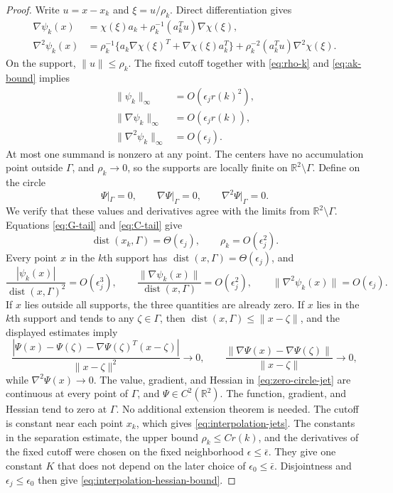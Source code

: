 \documentclass[11pt]{article}
\newcommand{\R}{\mathbb R}
\newcommand{\norm}[1]{\lVert #1\rVert}
\begin{document}
\begin{proof}
Write $u=x-x_k$ and $\xi=u/\rho_k$.  Direct differentiation gives
\begin{align*}
\nabla\psi_k(x)
&=\chi(\xi)a_k
+\rho_k^{-1}(a_k^Tu)\nabla\chi(\xi),\\
\nabla^2\psi_k(x)
&=\rho_k^{-1}\{a_k\nabla\chi(\xi)^T
+\nabla\chi(\xi)a_k^T\}
+\rho_k^{-2}(a_k^Tu)\nabla^2\chi(\xi).
\end{align*}
On the support, $\|u\|\le\rho_k$.  The fixed cutoff together with
\eqref{eq:rho-k} and \eqref{eq:ak-bound} implies
\begin{align*}
\|\psi_k\|_\infty&=O(\epsilon_jr(k)^2),\\
\|\nabla\psi_k\|_\infty&=O(\epsilon_jr(k)),\\
\|\nabla^2\psi_k\|_\infty&=O(\epsilon_j).
\end{align*}
At most one summand is nonzero at any point.  The centers have no accumulation
point outside $\Gamma$, and $\rho_k\to0$, so the supports are locally finite on
$\R^2\setminus\Gamma$.  Define on the circle
\begin{equation}\label{eq:zero-circle-jet}
\Psi|_\Gamma=0,\qquad
\nabla\Psi|_\Gamma=0,\qquad
\nabla^2\Psi|_\Gamma=0.
\end{equation}
We verify that these values and derivatives agree with the limits from
$\R^2\setminus\Gamma$.  Equations
\eqref{eq:G-tail} and \eqref{eq:C-tail} give
\[
\operatorname{dist}(x_k,\Gamma)=\Theta(\epsilon_j),
\qquad \rho_k=O(\epsilon_j^2).
\]
Every point $x$ in the $k$th support has
$\operatorname{dist}(x,\Gamma)=\Theta(\epsilon_j)$, and
\[
\frac{|\psi_k(x)|}{\operatorname{dist}(x,\Gamma)^2}=O(\epsilon_j^3),
\qquad
\frac{\|\nabla\psi_k(x)\|}{\operatorname{dist}(x,\Gamma)}
=O(\epsilon_j^2),
\qquad
\|\nabla^2\psi_k(x)\|=O(\epsilon_j).
\]
If $x$ lies outside all supports, the three quantities are already zero.  If
$x$ lies in the $k$th support and tends to any $\zeta\in\Gamma$, then
$\operatorname{dist}(x,\Gamma)\le\norm{x-\zeta}$, and the displayed estimates
imply
\[
\frac{|\Psi(x)-\Psi(\zeta)-\nabla\Psi(\zeta)^T(x-\zeta)|}
     {\norm{x-\zeta}^2}\longrightarrow0,
\qquad
\frac{\norm{\nabla\Psi(x)-\nabla\Psi(\zeta)}}
     {\norm{x-\zeta}}\longrightarrow0,
\]
while $\nabla^2\Psi(x)\to0$.  The value, gradient, and Hessian in
\eqref{eq:zero-circle-jet} are continuous at every point of $\Gamma$, and
$\Psi\in C^2(\R^2)$.  The function, gradient, and Hessian tend to zero at
$\Gamma$.  No additional extension theorem is needed.
The cutoff is constant near each point $x_k$, which gives
\eqref{eq:interpolation-jets}.  The constants in the separation estimate, the upper
bound $\rho_k\le Cr(k)$, and the derivatives of the fixed cutoff were chosen
on the fixed neighborhood $\epsilon\le\bar\epsilon$.  They give one constant
$K$ that does not depend on the later choice of
$\epsilon_0\le\bar\epsilon$.  Disjointness and
$\epsilon_j\le\epsilon_0$ then give
\eqref{eq:interpolation-hessian-bound}.
\end{proof}
\end{document}

